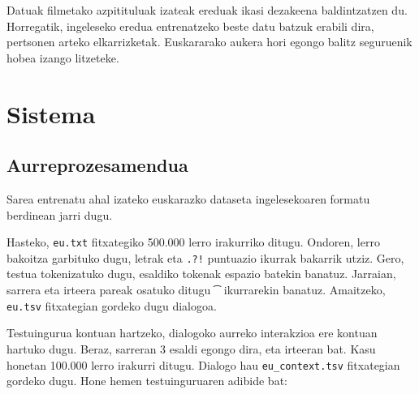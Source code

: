 \documentclass[11pt,a4paper]{article}
\begin{document}
Datuak filmetako azpitituluak izateak ereduak ikasi dezakeena baldintzatzen du. Horregatik, ingeleseko eredua entrenatzeko beste datu batzuk erabili dira, pertsonen arteko elkarrizketak. Euskararako aukera hori egongo balitz seguruenik hobea izango litzeteke.

\section{Sistema}

\subsection{Aurreprozesamendua}

Sarea entrenatu ahal izateko euskarazko dataseta ingelesekoaren formatu berdinean jarri dugu.

Hasteko, \texttt{eu.txt} fitxategiko 500.000 lerro irakurriko ditugu. Ondoren, lerro bakoitza garbituko dugu, letrak eta \texttt{.?!} puntuazio ikurrak bakarrik utziz. Gero, testua tokenizatuko dugu, esaldiko tokenak espazio batekin banatuz. Jarraian, sarrera eta irteera pareak osatuko ditugu \texttt{\t} ikurrarekin banatuz. Amaitzeko, \texttt{eu.tsv} fitxategian gordeko dugu dialogoa. 

Testuingurua kontuan hartzeko, dialogoko aurreko interakzioa ere kontuan hartuko dugu. Beraz, sarreran 3 esaldi egongo dira, eta irteeran bat. Kasu honetan 100.000 lerro irakurri ditugu. Dialogo hau \texttt{eu\_context.tsv} fitxategian gordeko dugu. Hone hemen testuinguruaren adibide bat: 
\end{document}
